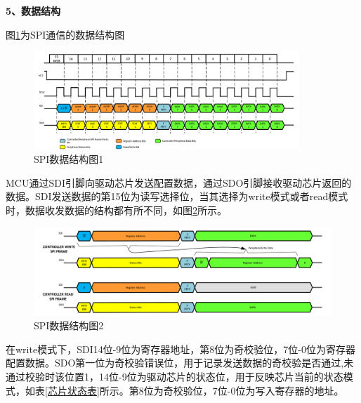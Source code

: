     
    \noindent
    \textbf{5、数据结构}\par
    图\ref{SPI数据结构图1}为SPI通信的数据结构图
    \begin{figure}[H]
        \centering
        \includegraphics[width=10cm]{figure/SPI Frame.png}
        \songti{}\caption{SPI数据结构图1}
        \label{SPI数据结构图1}
    \end{figure}
    MCU通过SDI引脚向驱动芯片发送配置数据，通过SDO引脚接收驱动芯片返回的数据。SDI发送数据的第15位为读写选择位，当其选择为write模式或者read模式时，数据收发数据的结构都有所不同，如图\ref{SPI数据结构图2}所示。
    \begin{figure}[H]
        \centering
        \includegraphics[width=12cm]{figure/SPI Transfer Sequence.png}
        \songti{}\caption{SPI数据结构图2}
        \label{SPI数据结构图2}
    \end{figure}
    在write模式下，SDI14位-9位为寄存器地址，第8位为奇校验位，7位-0位为寄存器配置数据。SDO第一位为奇校验错误位，用于记录发送数据的奇校验是否通过,未通过校验时该位置1，14位-9位为驱动芯片的状态位，用于反映芯片当前的状态模式，如表\ref{芯片状态表}所示。第8位为奇校验位，7位-0位为写入寄存器的地址。\par
    
